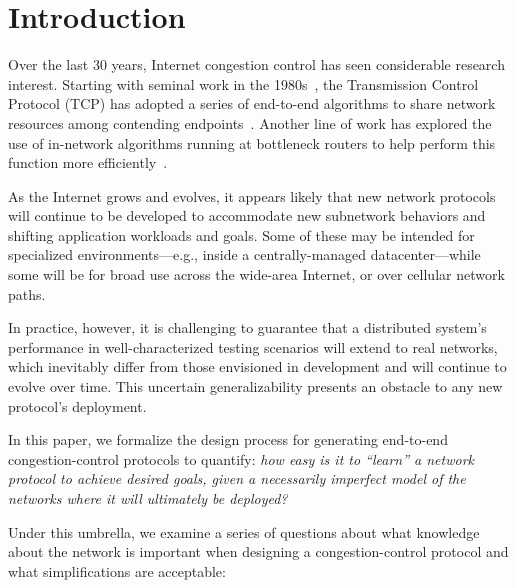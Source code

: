 \section{Introduction}
\label{s:intro}

Over the last 30 years, Internet congestion control has seen
considerable research interest. Starting with seminal work in the
1980s~\cite{decbit,Jacobson88,chiujain}, the Transmission Control
Protocol (TCP) has adopted a series of end-to-end algorithms to share
network resources among contending
endpoints~\cite{newreno,vegas,cubic,compound}. Another line of work
has explored the use of in-network algorithms running at bottleneck
routers to help perform this function more
efficiently~\cite{Floyd93,ecn,BLUE,AVQ,choke,CoDel,xcp}.

As the Internet grows and evolves, it appears likely that new network
protocols will continue to be developed to accommodate new subnetwork
behaviors and shifting application workloads and goals. Some of these
may be intended for specialized environments---e.g., inside a
centrally-managed datacenter---while some will be for broad use across
the wide-area Internet, or over cellular network paths.

In practice, however, it is challenging to guarantee that a
distributed system's performance in well-characterized testing
scenarios will extend to real networks, which inevitably differ from
those envisioned in development and will continue to evolve over time. This
uncertain generalizability presents an obstacle to any new protocol's
deployment.

In this paper, we formalize the design process for generating
end-to-end congestion-control protocols to quantify: \emph{how easy is
  it to ``learn'' a network protocol to achieve desired goals, given a
  necessarily imperfect model of the networks where it will ultimately
  be deployed?}

Under this umbrella, we examine a series of questions about what
knowledge about the network is important when designing a
congestion-control protocol and what simplifications are acceptable:

